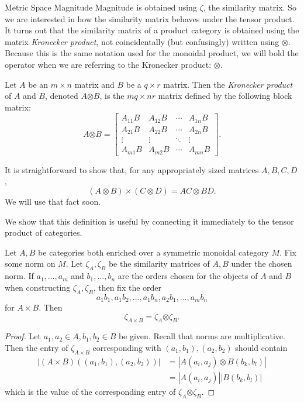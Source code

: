 \documentclass[12pt]{pom_thesis}
\newcommand{\kron}{\boldsymbol{\otimes}}
\begin{document}
\begin{chapter}{Metric Space Magnitude}
Magnitude is obtained using $\zeta$, the similarity matrix. So we are interested in how the similarity matrix behaves under the tensor product. It turns out that the similarity matrix of a product category is obtained using the matrix \emph{Kronecker product}, not coincidentally (but confusingly) written using $\otimes$. Because this is the same notation used for the monoidal product, we will bold the operator when we are referring to the Kronecker product: $\kron$.
\begin{defn}
Let $A$ be an $m \times n$ matrix and $B$ be a $q \times r$ matrix. Then the \emph{Kronecker product} of $A$ and $B$, denoted $A \kron B$, is the $mq \times nr$ matrix defined by the following block matrix:
\[
A \kron B = 
\begin{bmatrix}
A_{11}B & A_{12}B & \cdots & A_{1n}B \\
A_{21}B & A_{22}B & \cdots & A_{2n}B \\
\vdots & \vdots & \ddots & \vdots \\
A_{m1}B & A_{m2}B & \cdots & A_{mn}B
\end{bmatrix}.
\]
\end{defn}

\begin{rmk}\label{kron_prod}
It is straightforward to show that, for any appropriately sized matrices $A, B, C, D$,
\[
(A \otimes B) \times (C \otimes D) = AC \otimes BD.
\]
We will use that fact soon.
\end{rmk}
We show that this definition is useful by connecting it immediately to the tensor product of categories.

\begin{lemma}\label{tensor_kron}
Let $A, B$ be categories both enriched over a symmetric monoidal category $M$. Fix some norm on $M$. Let $\zeta_A, \zeta_B$ be the similarity matrices of $A,B$ under the chosen norm. If $a_1,\dots,a_m$ and $b_1,\dots,b_n$ are the orders chosen for the objects of $A$ and $B$ when constructing $\zeta_A, \zeta_B$, then fix the order \[a_1b_1, a_1b_2, \dots, a_1b_n, a_2b_1, \dots, a_mb_n\] for $A \times B$. Then
\[
\zeta_{A \times B} = \zeta_A \kron \zeta_B.
\]
\end{lemma}
\begin{proof}
Let $a_1, a_2 \in A, b_1, b_2 \in B$ be given. Recall that norms are multiplicative. Then the entry of $\zeta_{A \times B}$ corresponding with $(a_1, b_1), (a_2, b_2)$ should contain 
\begin{align*}
|(A \times B)((a_1, b_1), (a_2, b_2))|& = |A(a_i, a_j) \otimes B(b_k, b_l)|\\
&= |A(a_i, a_j)| |B(b_k, b_l)|
\end{align*}
which is the value of the corresponding entry of $\zeta_A \kron \zeta_B$.
\end{proof}


\end{chapter}
\end{document}
